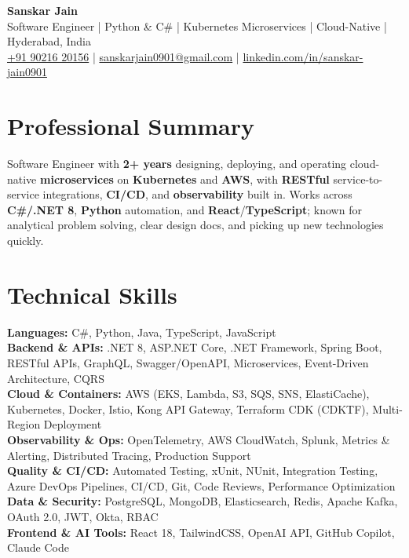 \documentclass[a4paper,10pt]{article}
\begin{document}
\begin{center}
    {\LARGE \textbf{Sanskar Jain}} \\
    \vspace{2pt}
    Software Engineer \;|\; Python \& C\# \;|\; Kubernetes Microservices \;|\; Cloud-Native \;|\; Hyderabad, India \\
    \vspace{2pt}
    \href{tel:+919021620156}{+91 90216 20156} \;|\;
    \href{mailto:sanskarjain0901@gmail.com}{sanskarjain0901@gmail.com} \;|\;
    \href{https://www.linkedin.com/in/sanskar-jain0901/}{linkedin.com/in/sanskar-jain0901}
\end{center}

\section*{Professional Summary}
Software Engineer with \textbf{2+ years} designing, deploying, and operating cloud-native \textbf{microservices} on \textbf{Kubernetes} and \textbf{AWS}, with \textbf{RESTful} service-to-service integrations, \textbf{CI/CD}, and \textbf{observability} built in.
Works across \textbf{C\#/.NET 8}, \textbf{Python} automation, and \textbf{React}/\textbf{TypeScript}; known for analytical problem solving, clear design docs, and picking up new technologies quickly.

\section*{Technical Skills}
\begin{sloppypar}
\noindent
\textbf{Languages:} C\#, Python, Java, TypeScript, JavaScript \\
\textbf{Backend \& APIs:} .NET 8, ASP.NET Core, .NET Framework, Spring Boot, RESTful APIs, GraphQL, Swagger/OpenAPI, Microservices, Event-Driven Architecture, CQRS \\
\textbf{Cloud \& Containers:} AWS (EKS, Lambda, S3, SQS, SNS, ElastiCache), Kubernetes, Docker, Istio, Kong API Gateway, Terraform CDK (CDKTF), Multi-Region Deployment \\
\textbf{Observability \& Ops:} OpenTelemetry, AWS CloudWatch, Splunk, Metrics \& Alerting, Distributed Tracing, Production Support \\
\textbf{Quality \& CI/CD:} Automated Testing, xUnit, NUnit, Integration Testing, Azure DevOps Pipelines, CI/CD, Git, Code Reviews, Performance Optimization \\
\textbf{Data \& Security:} PostgreSQL, MongoDB, Elasticsearch, Redis, Apache Kafka, OAuth 2.0, JWT, Okta, RBAC \\
\textbf{Frontend \& AI Tools:} React 18, TailwindCSS, OpenAI API, GitHub Copilot, Claude Code
\end{sloppypar}
\end{document}
